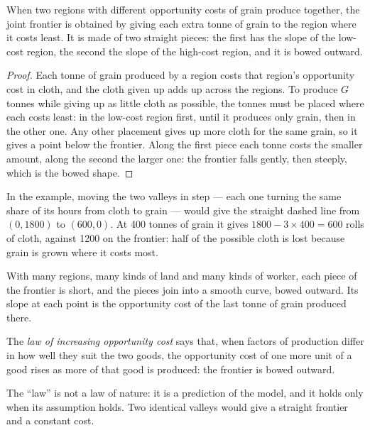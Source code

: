 \begin{proposition}\label{prop:g10:production-possibility-frontier:joint}
When two regions with different opportunity costs of grain produce together, the joint frontier is
obtained by giving each extra tonne of grain to the region where it costs least. It is made of two
straight pieces: the first has the slope of the low-cost region, the second the slope of the high-cost
region, and it is bowed outward.
\end{proposition}
\begin{proof}
Each tonne of grain produced by a region costs that region's opportunity cost in cloth, and the cloth
given up adds up across the regions. To produce $G$ tonnes while giving up as little cloth as possible,
the tonnes must be placed where each costs least: in the low-cost region first, until it produces only
grain, then in the other one. Any other placement gives up more cloth for the same grain, so it gives a
point below the frontier. Along the first piece each tonne costs the smaller amount, along the second
the larger one: the frontier falls gently, then steeply, which is the bowed shape.
\end{proof}

In the example, moving the two valleys in step --- each one turning the same share of its hours from
cloth to grain --- would give the straight dashed line from $(0, 1800)$ to $(600, 0)$. At 400 tonnes of
grain it gives $1800 - 3 \times 400 = 600$ rolls of cloth, against \num{1200} on the frontier: half of
the possible cloth is lost because grain is grown where it costs most.

With many regions, many kinds of land and many kinds of worker, each piece of the frontier is short,
and the pieces join into a smooth curve, bowed outward. Its slope at each point is the opportunity
cost of the last tonne of grain produced there.

\begin{definition}\label{def:g10:production-possibility-frontier:increasing-cost}
The \emph{law of increasing opportunity cost} says that,
when factors of production differ in how well they suit the two goods, the opportunity cost of one more
unit of a good rises as more of that good is produced: the frontier is bowed outward.
\end{definition}

The ``law'' is not a law of nature: it is a prediction of the model, and it holds only when its
assumption holds. Two identical valleys would give a straight frontier and a constant cost.

